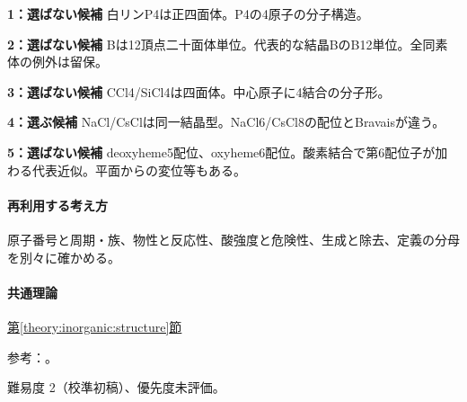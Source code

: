 \noindent\textbf{1：選ばない候補} 白リンP4は正四面体。P4の4原子の分子構造。\par

\noindent\textbf{2：選ばない候補} Bは12頂点二十面体単位。代表的な結晶BのB12単位。全同素体の例外は留保。\par

\noindent\textbf{3：選ばない候補} CCl4/SiCl4は四面体。中心原子に4結合の分子形。\par

\noindent\textbf{4：選ぶ候補} NaCl/CsClは同一結晶型。NaCl6/CsCl8の配位とBravaisが違う。\par

\noindent\textbf{5：選ばない候補} deoxyheme5配位、oxyheme6配位。酸素結合で第6配位子が加わる代表近似。平面からの変位等もある。\par

\paragraph{再利用する考え方} 原子番号と周期・族、物性と反応性、酸強度と危険性、生成と除去、定義の分母を別々に確かめる。

\paragraph{共通理論} \hyperref[theory:inorganic:structure]{第\ref*{theory:inorganic:structure}節}

\par 参考：\cite{openstax_crystals,inorganic_metalloid_ref,inorganic_heme}。

\par 難易度 2（校準初稿）、優先度未評価。
